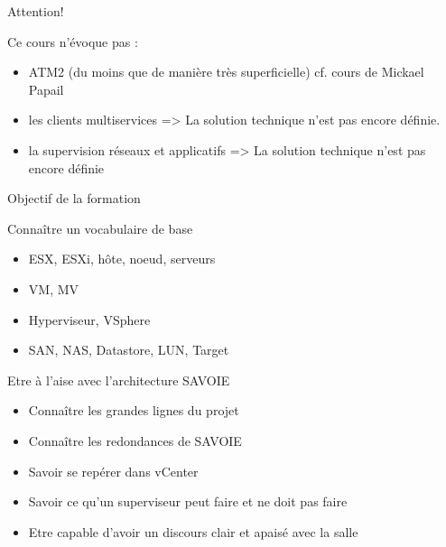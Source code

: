 \begin{frame}{Attention!}
\begin{block}{Ce cours n'évoque pas :}
\begin{itemize}
    \item ATM2 (du moins que de manière très superficielle) cf. cours de Mickael Papail
    \item les clients multiservices => La solution technique n'est pas encore définie. 
    \item la supervision réseaux et applicatifs => La solution technique n'est pas encore définie
\end{itemize}
\end{block}
\end{frame}

\begin{frame}{Objectif de la formation}
\begin{block}{Connaître un vocabulaire de base}
\begin{itemize}
\item ESX, ESXi, hôte, noeud, serveurs
\item VM, MV
\item Hyperviseur, VSphere
\item SAN, NAS, Datastore, LUN, Target 
\end{itemize}  
\end{block} 
\begin{block}{Etre à l'aise avec l'architecture SAVOIE}
\begin{itemize}
\item Connaître les grandes lignes du projet
\item Connaître les redondances de SAVOIE
\item Savoir se repérer dans vCenter
\item Savoir ce qu'un superviseur peut faire et ne doit pas faire
\item Etre capable d'avoir un discours clair et apaisé avec la salle
\end{itemize}  
\end{block} 
\end{frame}
